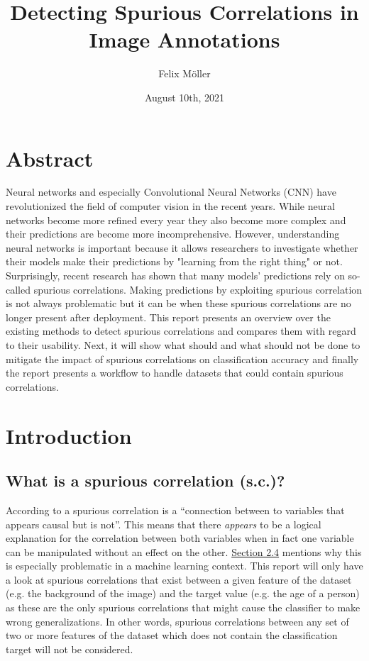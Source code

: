 \documentclass{article}
\title{Detecting Spurious Correlations in Image Annotations}
\author{Felix Möller}
\date{August 10th, 2021}
\begin{document}
\maketitle
\tableofcontents
\newpage
\section{Abstract}
Neural networks and especially Convolutional Neural Networks (CNN) have revolutionized the field of computer vision in the recent years.
While neural networks become more refined every year they also become more complex and their predictions are become more incomprehensive.
However, understanding neural networks is important because it allows researchers to investigate whether their models make
their predictions by "learning from the right thing" or not. Surprisingly, recent research has shown that many models' predictions
rely on so-called spurious correlations. Making predictions by exploiting spurious correlation is not always problematic but it can be when
these spurious correlations are no longer present after deployment.
This report presents an overview over the existing methods to detect spurious correlations and compares them with regard to their usability.
Next, it will show what should and what should not be done to mitigate the impact of spurious correlations on classification
accuracy and finally the report presents a workflow to handle datasets that could contain spurious correlations. 


\section{Introduction}
\subsection{What is a spurious correlation (s.c.)?}
According to \cite{sc_def} a spurious correlation is a \enquote{connection between to variables that appears causal but is not}.
This means that there \textit{appears} to be a logical explanation for the correlation between both variables when in fact one variable 
can be manipulated without an effect on the other.
\hyperref[sec:challenges]{Section 2.4} mentions why this is especially problematic in a machine learning context.
This report will only have a look at spurious correlations that exist between a given feature of the dataset (e.g. the background of the image)
and the target value (e.g. the age of a person) as these are the only spurious correlations that might cause the classifier to make wrong generalizations.
In other words, spurious correlations between any set of two or more features of the dataset which does not contain the classification
target will not be considered.
\end{document}
